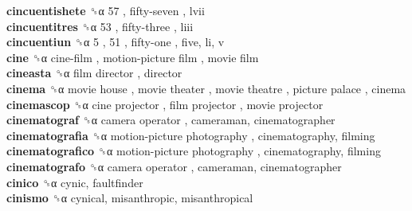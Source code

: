 \textbf{cincuentishete} ␝α   57 ,  fifty-seven , lvii  \\
\textbf{cincuentitres} ␝α   53 ,  fifty-three , liii  \\
\textbf{cincuentiun} ␝α   5 ,  51 ,  fifty-one , five, li, v  \\
\textbf{cine} ␝α   cine-film ,  motion-picture film ,  movie film   \\
\textbf{cineasta} ␝α   film director , director  \\
\textbf{cinema} ␝α   movie house ,  movie theater ,  movie theatre ,  picture palace , cinema  \\
\textbf{cinemascop} ␝α   cine projector ,  film projector ,  movie projector   \\
\textbf{cinematograf} ␝α   camera operator , cameraman, cinematographer  \\
\textbf{cinematografia} ␝α   motion-picture photography , cinematography, filming  \\
\textbf{cinematografico} ␝α   motion-picture photography , cinematography, filming  \\
\textbf{cinematografo} ␝α   camera operator , cameraman, cinematographer  \\
\textbf{cinico} ␝α  cynic, faultfinder  \\
\textbf{cinismo} ␝α  cynical, misanthropic, misanthropical  \\
